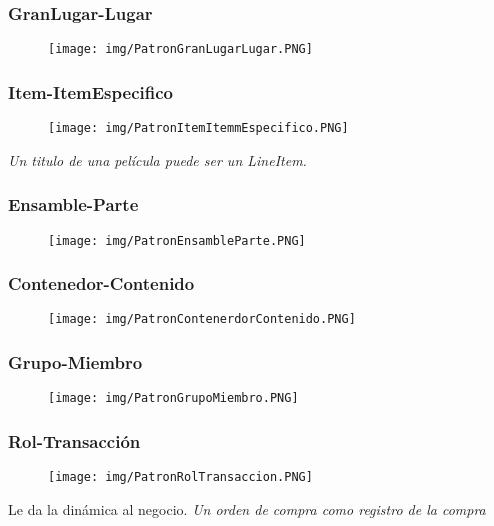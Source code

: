 \subsubsection*{GranLugar-Lugar}
\begin{figure}[!htb]
    \centering
    \texttt{[image: img/PatronGranLugarLugar.PNG]}
\end{figure}
\newpage
\subsubsection*{Item-ItemEspecifico}

\begin{figure}[!htb]
    \centering
    \texttt{[image: img/PatronItemItemmEspecifico.PNG]}
\end{figure}
\textit{Un titulo de una película puede ser un LineItem.}

\subsubsection*{Ensamble-Parte}
\begin{figure}[!htb]
    \centering
    \texttt{[image: img/PatronEnsambleParte.PNG]}
\end{figure}

\subsubsection*{Contenedor-Contenido}
\begin{figure}[!htb]
    \centering
    \texttt{[image: img/PatronContenerdorContenido.PNG]}
\end{figure}
\newpage
\subsubsection*{Grupo-Miembro}
\begin{figure}[!htb]
    \centering
    \texttt{[image: img/PatronGrupoMiembro.PNG]}
\end{figure}

\subsubsection*{Rol-Transacción}

\begin{figure}[!htb]
    \centering
    \texttt{[image: img/PatronRolTransaccion.PNG]}
\end{figure}
Le da la dinámica al negocio. \textit{Un orden de compra como registro de la compra}
